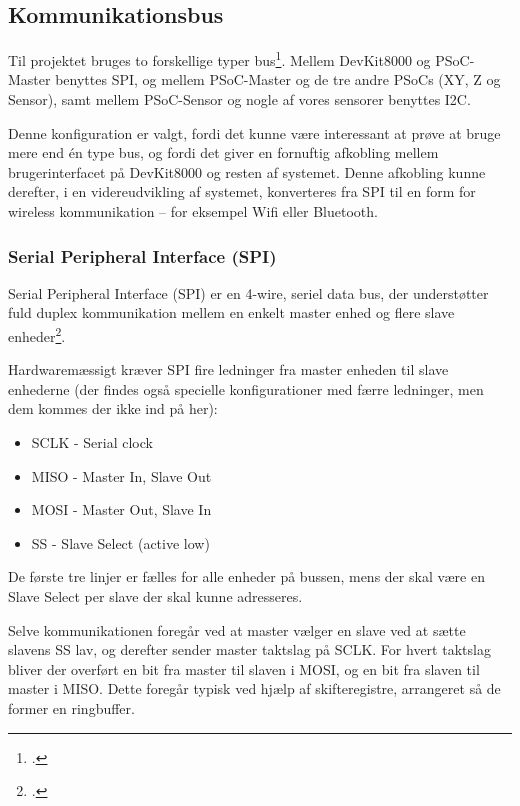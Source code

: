 \subsection{Kommunikationsbus}

Til projektet bruges to forskellige typer bus\footcite{gfv}. Mellem DevKit8000 og PSoC-Master benyttes SPI, og mellem PSoC-Master og de tre andre PSoCs (XY, Z og Sensor), samt mellem PSoC-Sensor og nogle af vores sensorer benyttes I2C.

Denne konfiguration er valgt, fordi det kunne være interessant at prøve at bruge mere end én type bus, og fordi det giver en fornuftig afkobling mellem brugerinterfacet på DevKit8000 og resten af systemet. Denne afkobling kunne derefter, i en videreudvikling af systemet, konverteres fra SPI til en form for wireless kommunikation – for eksempel Wifi eller Bluetooth.

\subsubsection{Serial Peripheral Interface (SPI)}

Serial Peripheral Interface (SPI) er en 4-wire, seriel data bus, der understøtter fuld duplex kommunikation mellem en enkelt master enhed og flere slave enheder\footcite{gfv}.

Hardwaremæssigt kræver SPI fire ledninger fra master enheden til slave enhederne (der findes også specielle konfigurationer med færre ledninger, men dem kommes der ikke ind på her):

\begin{itemize}
    \item SCLK - Serial clock
    \item MISO - Master In, Slave Out
    \item MOSI - Master Out, Slave In
    \item SS - Slave Select (active low)
\end{itemize}

De første tre linjer er fælles for alle enheder på bussen, mens der skal være en Slave Select per slave der skal kunne adresseres.

Selve kommunikationen foregår ved at master vælger en slave ved at sætte slavens SS lav, og derefter sender master taktslag på SCLK. For hvert taktslag bliver der overført en bit fra master til slaven i MOSI, og en bit fra slaven til master i MISO. Dette foregår typisk ved hjælp af skifteregistre, arrangeret så de former en ringbuffer.

